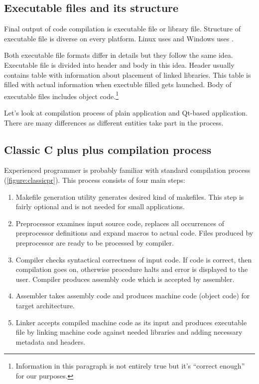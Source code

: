 \subsection{Executable files and its structure}
Final output of \cpp code compilation is executable file or library file. Structure of executable file is diverse on every platform. Linux uses  and Windows uses .

Both executable file formats differ in details but they follow the same idea. Executable file is divided into header and body in this idea. Header usually contains table with information about placement of linked libraries. This table is filled with actual information when exectuble filled gets launched. Body of executable files includes object code.\footnote{Information in this paragraph is not entirely true but it's \enquote{correct enough} for our purposes.}

Let's look at compilation process of plain \cpp application and Qt-based application. There are many differences as different entities take part in the process.

\subsection{Classic C plus plus compilation process}
Experienced \cpp programmer is probably familiar with standard compilation process (\autoref{figure:classicpr}). This process consists of four main steps:
\begin{enumerate}
\item Makefile generation utility generates desired kind of makefiles. This step is fairly optional and is not needed for small applications.
\item Preprocessor examines input source code, replaces all occurrences of preprocessor definitions and expand macros to actual code. Files produced by preprocessor are ready to be processed by compiler.
\item Compiler checks syntactical correctness of input \cpp code. If code is correct, then compilation goes on, otherwise procedure halts and error is displayed to the user. Compiler produces assembly code which is accepted by assembler.
\item Assembler takes assembly code and produces machine code (object code) for target architecture.
\item Linker accepts compiled machine code as its input and produces executable file by linking machine code against needed libraries and adding necessary metadata and headers.
\end{enumerate}

